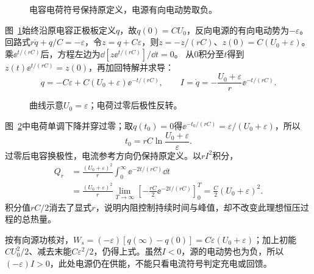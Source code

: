 \begin{figure}[H]\centering
{}
\caption{电容电荷符号保持原定义，电源有向电动势取负。}\label{fig:c4-h2-q}
\end{figure}
\begin{solution}
图~\ref{fig:c4-h2-q}始终沿原电容正极板定义$q$，故$q(0)=CU_0$，反向电源的有向电动势为$-\varepsilon$。回路式$r\dot q+q/C=-\varepsilon$，令$z=q+C\varepsilon$，则$\dot z=-z/(rC)$、$z(0)=C(U_0+\varepsilon)$。
乘$\ee^{t/(rC)}$后，方程左边为$\dd[z\ee^{t/(rC)}]/\dd t=0$。
从$0$积分至$t$得到$z(t)\ee^{t/(rC)}=z(0)$，再加回特解并求导：
\[
 q=-C\varepsilon+C(U_0+\varepsilon)\ee^{-t/(rC)},\qquad
 I=\dot q=-\frac{U_0+\varepsilon}r\ee^{-t/(rC)}.
\]
\begin{figure}[H]\centering
{}
\caption{曲线示意$U_0=\varepsilon$；电荷过零后极性反转。}\label{fig:c4-h2-s}
\end{figure}
图~\ref{fig:c4-h2-s}中电荷单调下降并穿过零；取$q(t_0)=0$得$\ee^{-t_0/(rC)}=\varepsilon/(U_0+\varepsilon)$，所以
\[
 \boxed{t_0=rC\ln\frac{U_0+\varepsilon}{\varepsilon}}.
\]
过零后电容换极性，电流参考方向仍保持原定义。以$rI^2$积分，
\[\begin{aligned}
 Q_r&=\frac{(U_0+\varepsilon)^2}r\int_0^\infty\ee^{-2t/(rC)}\dd t\\
 &=\frac{(U_0+\varepsilon)^2}r
 \lim_{T\to\infty}\left[-\frac{rC}2\ee^{-2t/(rC)}\right]_0^T
 =\boxed{\frac C2(U_0+\varepsilon)^2}.
\end{aligned}\]
积分值$rC/2$消去了显式$r$，说明内阻控制持续时间与峰值，却不改变此理想恒压过程的总热量。

按有向源功核对，$W_s=(-\varepsilon)[q(\infty)-q(0)]=C\varepsilon(U_0+\varepsilon)$；加上初能$CU_0^2/2$、减去末能$C\varepsilon^2/2$，仍得上式。虽然$I<0$，源的电动势也为负，所以$(-\varepsilon)I>0$，此处电源仍在供能，不能只看电流符号判定充电或回馈。
\end{solution}

